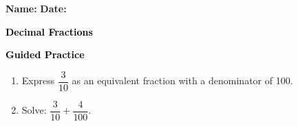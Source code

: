 \documentclass[12pt, letterpaper, fleqn]{article}
\begin{document}
\textbf{Name:} \underline{\hspace{5cm}}
\hfill
\textbf{Date:} \underline{\hspace{3cm}}\\

\begin{tcolorbox}[colback=customteal!20]
    \large\textcolor{black}{\textbf{Decimal Fractions}}
\end{tcolorbox}
\newpage
\begin{tcolorbox}[colback=customteal!20]
    \large\textcolor{black}{\textbf{Guided Practice}}
\end{tcolorbox}
\begin{enumerate}[itemsep=3.5cm, leftmargin=0.6cm]
\item Express $\dfrac{3}{10}$ as an equivalent fraction with a denominator of 100.
\vspace{3cm}
\item Solve: $\dfrac{3}{10} + \dfrac{4}{100}$.
\end{enumerate}
\end{document}
